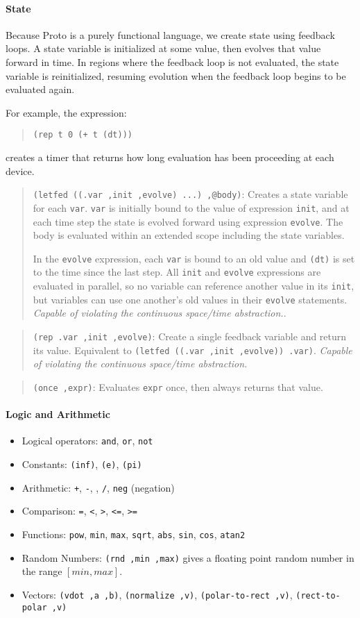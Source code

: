 \documentclass{article}
\newcommand\violation{{\em Capable of violating the continuous
    space/time abstraction.}}
\newcommand\code[1]{\begin{quote}\var{#1}\end{quote}}
\newcommand\function[2]
{\begin{quote}{\tt #1}: #2 \end{quote}}
\newcommand\var[1]{{\tt #1}}
\begin{document}
\paragraph{State}

Because Proto is a purely functional language, we create state using
feedback loops.  A state variable is initialized at some value, then
evolves that value forward in time.  In regions where the feedback
loop is not evaluated, the state variable is reinitialized, resuming
evolution when the feedback loop begins to be evaluated again.

For example, the expression: \code{(rep t 0 (+ t (dt)))}
creates a timer that returns how long evaluation has been proceeding
at each device.

\function{(letfed ((.var ,init ,evolve) ...)  ,@body)}{Creates a state
  variable for each \var{var}.  \var{var} is initially bound to the
  value of expression \var{init}, and at each time step the state is
  evolved forward using expression \var{evolve}.  The body is
  evaluated within an extended scope including the state variables.
  
  In the \var{evolve} expression, each \var{var} is bound to an old
  value and \var{(dt)} is set to the time since the last step.
  All \var{init} and \var{evolve} expressions are evaluated in
  parallel, so no variable can reference another value in its
  \var{init}, but variables can use one another's old values in their
  \var{evolve} statements.  \violation{}.}

\function{(rep .var ,init ,evolve)}{Create a single feedback variable
  and return its value.  Equivalent to \var{(letfed ((.var ,init
    ,evolve)) .var)}.  \violation{}}

\function{(once ,expr)}{Evaluates \var{expr} once, then always returns
  that value.}

\paragraph{Logic and Arithmetic}

\begin{itemize}
\item Logical operators: \var{and}, \var{or}, \var{not}
\item Constants: \var{(inf)}, \var{(e)}, \var{(pi)}
\item Arithmetic: \var{+}, \var{-}, \var{*},  \var{/}, \var{neg} (negation)
\item Comparison: \var{=}, \var{<}, \var{>}, \var{<=}, \var{>=}
\item Functions: \var{pow}, \var{min}, \var{max}, \var{sqrt}, \var{abs}, 
  \var{sin}, \var{cos}, \var{atan2}
\item Random Numbers: \var{(rnd ,min ,max)} gives a floating point
  random number in the range $[min, max]$.
\item Vectors: \var{(vdot ,a ,b)}, \var{(normalize ,v)}, 
  \var{(polar-to-rect ,v)}, \var{(rect-to-polar ,v)}
\end{itemize}
\end{document}
